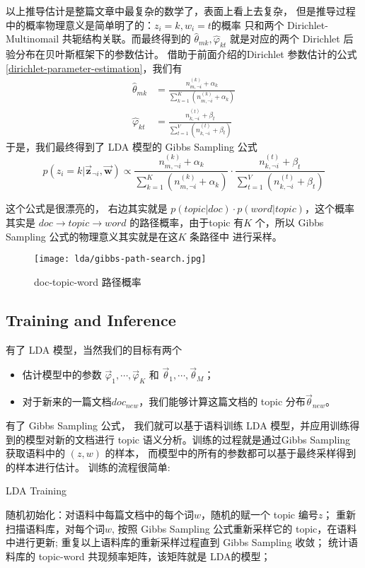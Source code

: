 以上推导估计是整篇文章中最复杂的数学了，表面上看上去复杂，
但是推导过程中的概率物理意义是简单明了的：$z_i = k, w_i = t $的概率
只和两个 Dirichlet-Multinomail 共轭结构关联。而最终得到的 $\hat{\theta}_{mk}, \hat{\varphi}_{kt}$
就是对应的两个 Dirichlet 后验分布在贝叶斯框架下的参数估计。
借助于前面介绍的Dirichlet 参数估计的公式 \eqref{dirichlet-parameter-estimation}，我们有
\begin{align*}
\hat{\theta}_{mk} &= \frac{n_{m,\neg i}^{(k)} + \alpha_k}{\sum_{k=1}^K (n_{m,\neg i}^{(k)} + \alpha_k)} \\
\hat{\varphi}_{kt} &= \frac{n_{k,\neg i}^{(t)} + \beta_t}{\sum_{t=1}^V (n_{k,\neg i}^{(t)} + \beta_t)}
\end{align*}
于是，我们最终得到了 LDA 模型的 Gibbs Sampling 公式
\begin{equation}
\label{gibbs-sampling}
p(z_i = k|\vec{\mathbf{z}}_{\neg i}, \vec{\mathbf{w}})  \propto
\frac{n_{m,\neg i}^{(k)} + \alpha_k}{\sum_{k=1}^K (n_{m,\neg i}^{(k)} + \alpha_k)}
\cdot \frac{n_{k,\neg i}^{(t)} + \beta_t}{\sum_{t=1}^V (n_{k,\neg i}^{(t)} + \beta_t)}
\end{equation}

这个公式是很漂亮的， 右边其实就是 $p(topic|doc) \cdot p(word|topic)$，这个概率其实是 $doc \rightarrow topic \rightarrow word$ 的路径概率，由于topic 有$K$ 个，所以 Gibbs Sampling 公式的物理意义其实就是在这$K$ 条路径中
进行采样。

\begin{figure}[H]
\centering
\texttt{[image: lda/gibbs-path-search.jpg]}
\caption{doc-topic-word 路径概率}
\end{figure}

\subsection{Training and Inference}

有了 LDA 模型，当然我们的目标有两个
\begin{itemize}
\item 估计模型中的参数 $\vec{\varphi}_1, \cdots, \vec{\varphi}_K$ 和 $\vec{\theta}_1, \cdots, \vec{\theta}_M$；
\item 对于新来的一篇文档$doc_{new}$，我们能够计算这篇文档的 topic 分布$\vec{\theta}_{new}$。
\end{itemize}

有了 Gibbs Sampling 公式， 我们就可以基于语料训练 LDA 模型，并应用训练得到的模型对新的文档进行
topic 语义分析。训练的过程就是通过Gibbs Sampling 获取语料中的 $(z,w)$ 的样本，
而模型中的所有的参数都可以基于最终采样得到的样本进行估计。
训练的流程很简单:
\begin{algorithm}[H]
\caption{LDA Training}
\begin{algorithmic}[1]
\STATE 随机初始化：对语料中每篇文档中的每个词$w$，随机的赋一个 topic 编号$z$；
\STATE 重新扫描语料库，对每个词$w$, 按照 Gibbs Sampling 公式重新采样它的 topic，在语料中进行更新;
\STATE 重复以上语料库的重新采样过程直到 Gibbs Sampling 收敛；
\STATE 统计语料库的 topic-word 共现频率矩阵，该矩阵就是 LDA的模型；
\end{algorithmic}
\end{algorithm}

